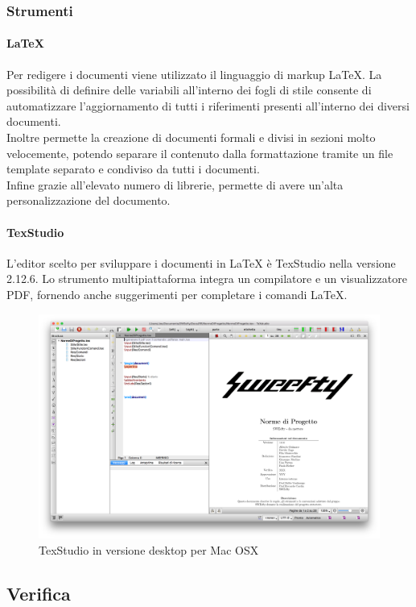 	\subsubsection{Strumenti}
		\paragraph{\LaTeX}\Spazio
		Per redigere i documenti viene utilizzato il linguaggio di markup \LaTeX. La possibilità di definire delle variabili all'interno dei fogli di stile consente di automatizzare l'aggiornamento di tutti i riferimenti presenti all'interno dei diversi documenti.\\
		Inoltre permette la creazione di documenti formali e divisi in sezioni molto velocemente, potendo separare il contenuto dalla formattazione tramite un file template separato e condiviso da tutti i documenti.\\
		Infine grazie all'elevato numero di librerie, permette di avere un'alta personalizzazione del documento.
		\paragraph{TexStudio}\Spazio
		L'editor scelto per sviluppare i documenti in \LaTeX\text{ } è TexStudio nella versione 2.12.6. 
		Lo strumento multipiattaforma integra un compilatore e un visualizzatore PDF, fornendo anche suggerimenti per completare i comandi \LaTeX.
		\begin{figure}[H]
				\centering
				\includegraphics[width=1\textwidth]{Images/texstudio.png}
				\caption{TexStudio in versione desktop per Mac OSX}
			\end{figure}
			
\subsection{Verifica}

